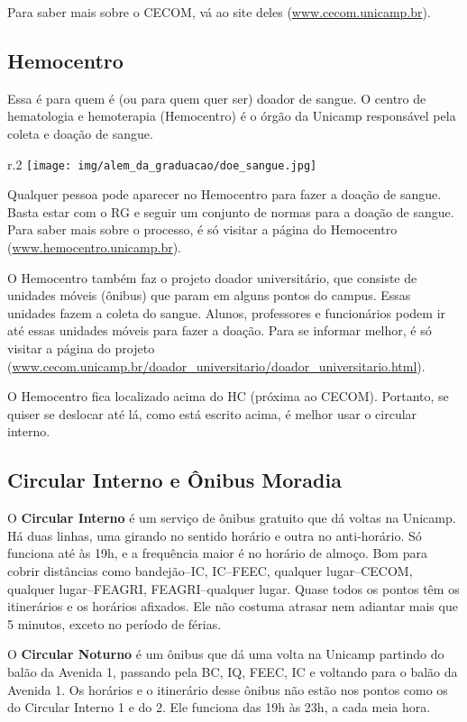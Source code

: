 Para saber mais sobre o CECOM, vá ao site deles (\url{www.cecom.unicamp.br}).

\subsection{Hemocentro}

Essa é para quem é (ou para quem quer ser) doador de sangue. O centro de
hematologia e hemoterapia (Hemocentro) é o órgão da Unicamp responsável pela
coleta e doação de sangue.
\begin{wrapfigure}{r}{.2\textwidth}
    \centering
    \texttt{[image: img/alem\_da\_graduacao/doe\_sangue.jpg]}
\end{wrapfigure}
Qualquer pessoa pode aparecer no Hemocentro para fazer a doação de sangue. Basta
estar com o RG e seguir um conjunto de normas para a doação de sangue. Para
saber mais sobre o processo, é só visitar a página do Hemocentro
(\url{www.hemocentro.unicamp.br}).


O Hemocentro também faz o projeto doador universitário, que consiste de unidades
móveis (ônibus) que param em alguns pontos do campus. Essas unidades fazem a
coleta do sangue. Alunos, professores e funcionários podem ir até essas unidades
móveis para fazer a doação. Para se informar melhor, é só visitar a página do
projeto
(\url{www.cecom.unicamp.br/doador_universitario/doador_universitario.html}).

O Hemocentro fica localizado acima do HC (próxima ao CECOM). Portanto, se quiser
se deslocar até lá, como está escrito acima, é melhor usar o circular interno.

\subsection{Circular Interno e Ônibus Moradia}

O \textbf{Circular Interno} é um serviço de ônibus gratuito que dá voltas na
Unicamp. Há duas linhas, uma girando no sentido horário e outra no anti-horário.
Só funciona até às 19h, e a frequência maior é no horário de almoço. Bom para
cobrir distâncias como bandejão--IC, IC--FEEC, qualquer lugar--CECOM, qualquer
lugar--FEAGRI, FEAGRI--qualquer lugar. Quase todos os pontos têm os itinerários
e os horários afixados.  Ele não costuma atrasar nem adiantar mais que 5
minutos, exceto no período de férias.

O \textbf{Circular Noturno} é um ônibus que dá uma volta na Unicamp partindo do
balão da Avenida 1, passando pela BC, IQ, FEEC, IC e voltando para o balão da
Avenida 1.  Os horários e o itinerário desse ônibus não estão nos pontos como os
do Circular Interno 1 e do 2. Ele funciona das 19h às 23h, a cada meia hora.

